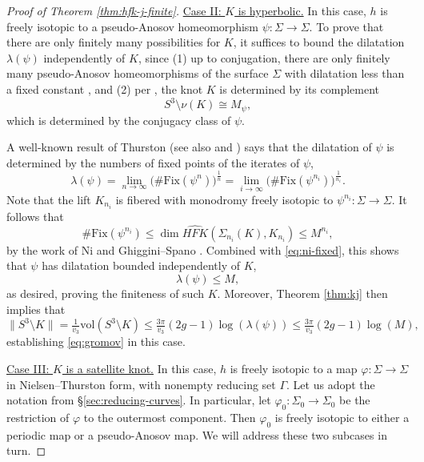 \documentclass[11pt]{amsart}
\numberwithin{equation}{section}
\numberwithin{theorem}{section}
\theoremstyle{definition}
\renewcommand{\phi}{\varphi}
\newcommand\HFK{\widehat{\mathit{HFK}}}
\begin{document}
\begin{proof}[Proof of Theorem \ref{thm:hfk-j-finite}]
\vspace{1em}\noindent
\underline{Case II: $K$ is hyperbolic.} In this case, $h$ is freely isotopic to a pseudo-Anosov homeomorphism $\psi:\Sigma\to \Sigma$. To prove that there are only finitely many possibilities for $K$, it suffices to bound the dilatation $\lambda(\psi)$ independently of $K$, since (1) up to conjugation, there are only finitely many pseudo-Anosov homeomorphisms of the surface $\Sigma$ with dilatation less than a fixed constant \cite{ivanov-bounded-dilatation}, and (2) per \cite{gordon-luecke-complement}, the knot $K$ is determined by its complement \[S^3\setminus \nu(K)\cong M_\psi, \] which is determined by the conjugacy class of $\psi$. 

A well-known result of Thurston \cite{thurston-surfaces} (see also \cite{flp,ivanov-entropy} and \cite[Lemma 2.4]{bs-ribbon}) says that the dilatation of $\psi$ is determined by the numbers of fixed points of the iterates of $\psi$, \begin{equation}\label{eq:ni-fixed}\lambda(\psi) = \lim_{n\to\infty}\big(\#\textrm{Fix}(\psi^n)\big)^{\frac{1}{n}}= \lim_{i\to\infty}\big(\#\textrm{Fix}(\psi^{n_i})\big)^{\frac{1}{n_i}}.\end{equation}
Note that the lift $K_{n_i}$ is fibered with monodromy freely isotopic to $\psi^{n_i}:\Sigma\to\Sigma$. It follows that \[\#\textrm{Fix}(\psi^{n_i}) \leq \dim\HFK(\Sigma_{n_i}(K),K_{n_i})\leq M^{n_i},\] by the work of Ni \cite{ni-fixed} and Ghiggini--Spano \cite{ghiggini-spano}. Combined with \eqref{eq:ni-fixed}, this shows that $\psi$ has dilatation bounded independently of $K$, \[\lambda(\psi)\leq M,\] as desired, proving the finiteness of such $K$. Moreover, Theorem \ref{thm:kj} then implies that \[ \lVert S^3\setminus K \rVert = \tfrac{1}{v_3}\mathrm{vol}(S^3\setminus K) \leq \tfrac{3\pi}{v_3}(2g-1)\log(\lambda(\psi))\leq \tfrac{3\pi}{v_3}(2g-1)\log(M),\] establishing \eqref{eq:gromov} in this case.

\vspace{1em}\noindent
\underline{Case III: $K$ is a satellite knot.} In this case, $h$ is freely isotopic to a map $\phi:\Sigma\to\Sigma$ in Nielsen--Thurston form, with nonempty reducing set $\Gamma$. Let us adopt the notation from \S\ref{sec:reducing-curves}. In particular, let $\varphi_0:\Sigma_0\to\Sigma_0$ be the restriction of $\varphi$ to the outermost component. Then $\varphi_0$ is freely isotopic to either a periodic map or a pseudo-Anosov map. We will address these two subcases in turn.


\end{proof}
\end{document}
